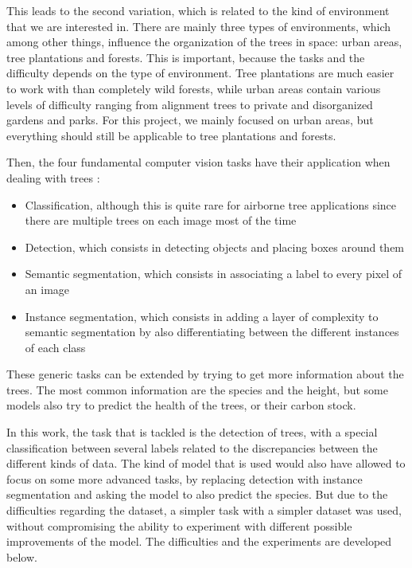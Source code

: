 \documentclass[
]{report}
\providecommand{\tightlist}{%
  \setlength{\itemsep}{0pt}\setlength{\parskip}{0pt}}\usepackage{longtable,booktabs,array}
\begin{document}
This leads to the second variation, which is related to the kind of
environment that we are interested in. There are mainly three types of
environments, which among other things, influence the organization of
the trees in space: urban areas, tree plantations and forests. This is
important, because the tasks and the difficulty depends on the type of
environment. Tree plantations are much easier to work with than
completely wild forests, while urban areas contain various levels of
difficulty ranging from alignment trees to private and disorganized
gardens and parks. For this project, we mainly focused on urban areas,
but everything should still be applicable to tree plantations and
forests.

Then, the four fundamental computer vision tasks have their application
when dealing with trees \autocite{olive-tree}:

\begin{itemize}
\tightlist
\item
  Classification, although this is quite rare for airborne tree
  applications since there are multiple trees on each image most of the
  time
\item
  Detection, which consists in detecting objects and placing boxes
  around them
\item
  Semantic segmentation, which consists in associating a label to every
  pixel of an image
\item
  Instance segmentation, which consists in adding a layer of complexity
  to semantic segmentation by also differentiating between the different
  instances of each class
\end{itemize}

These generic tasks can be extended by trying to get more information
about the trees. The most common information are the species and the
height, but some models also try to predict the health of the trees, or
their carbon stock.

In this work, the task that is tackled is the detection of trees, with a
special classification between several labels related to the
discrepancies between the different kinds of data. The kind of model
that is used would also have allowed to focus on some more advanced
tasks, by replacing detection with instance segmentation and asking the
model to also predict the species. But due to the difficulties regarding
the dataset, a simpler task with a simpler dataset was used, without
compromising the ability to experiment with different possible
improvements of the model. The difficulties and the experiments are
developed below.
\end{document}
